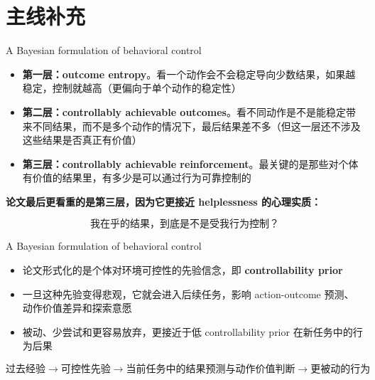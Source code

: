 \documentclass[aspectratio=169]{beamer}
\begin{document}
\section{主线补充}

\begin{frame}[t]{A Bayesian formulation of behavioral control}
\small
\begin{itemize}
    \item \textbf{第一层：outcome entropy}。看一个动作会不会稳定导向少数结果，如果越稳定，控制就越高（更偏向于单个动作的稳定性）
    \item \textbf{第二层：controllably achievable outcomes}。看不同动作是不是能稳定带来不同结果，而不是多个动作的情况下，最后结果差不多（但这一层还不涉及这些结果是否真正有价值）
    \item \textbf{第三层：controllably achievable reinforcement}。最关键的是那些对个体有价值的结果里，有多少是可以通过行为可靠控制的
\end{itemize}

\vspace{0.08cm}
\textbf{论文最后更看重的是第三层，因为它更接近 helplessness 的心理实质：}

\[
\text{我在乎的结果，到底是不是受我行为控制？}
\]
\end{frame}

\begin{frame}[c]{A Bayesian formulation of behavioral control}
\small
\centering
\begin{minipage}{0.86\textwidth}
\begin{itemize}
    \item 论文形式化的是个体对环境可控性的先验信念，即 \textbf{controllability prior}
    \item 一旦这种先验变得悲观，它就会进入后续任务，影响 action-outcome 预测、动作价值差异和探索意愿
    \item 被动、少尝试和更容易放弃，更接近于低 controllability prior 在新任务中的行为后果
\end{itemize}
\end{minipage}

\vspace{0.18cm}
\centering
\[
\text{过去经验}
\rightarrow
\text{可控性先验}
\rightarrow
\text{当前任务中的结果预测与动作价值判断}
\rightarrow
\text{更被动的行为}
\]
\end{frame}
\end{document}
